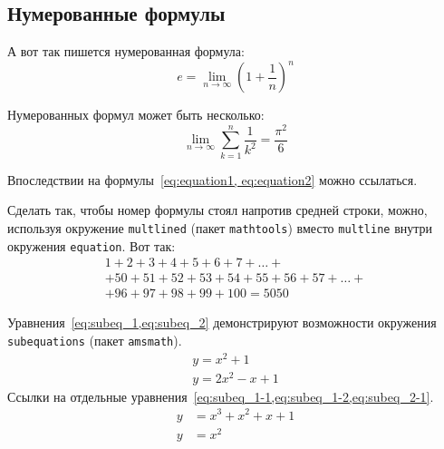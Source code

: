 \subsection{Нумерованные формулы}\label{subsec:ch1/sec3/sub3}

А вот так пишется нумерованная формула:
\begin{equation}
    \label{eq:equation1}
    e = \lim_{n \to \infty} \left( 1+\frac{1}{n} \right) ^n
\end{equation}

Нумерованных формул может быть несколько:
\begin{equation}
    \label{eq:equation2}
    \lim_{n \to \infty} \sum_{k=1}^n \frac{1}{k^2} = \frac{\pi^2}{6}
\end{equation}

Впоследствии на формулы~\cref{eq:equation1, eq:equation2} можно ссылаться.

Сделать так, чтобы номер формулы стоял напротив средней строки, можно,
используя окружение \verb|multlined| (пакет \verb|mathtools|) вместо
\verb|multline| внутри окружения \verb|equation|. Вот так:
\begin{equation} %
    \label{eq:equation3}
    \begin{multlined}
        1+ 2+3+4+5+6+7+\dots + \\
        + 50+51+52+53+54+55+56+57 + \dots + \\
        + 96+97+98+99+100=5050
    \end{multlined}
\end{equation}

Уравнения~\cref{eq:subeq_1,eq:subeq_2} демонстрируют возможности
окружения \verb|subequations| (пакет \verb|amsmath|).
\begin{subequations}
    \label{eq:subeq_1}
    \begin{gather}
        y = x^2 + 1 \label{eq:subeq_1-1} \\
        y = 2 x^2 - x + 1 \label{eq:subeq_1-2}
    \end{gather}
\end{subequations}
Ссылки на отдельные уравнения~\cref{eq:subeq_1-1,eq:subeq_1-2,eq:subeq_2-1}.
\begin{subequations}
    \label{eq:subeq_2}
    \begin{align}
        y & = x^3 + x^2 + x + 1 \label{eq:subeq_2-1} \\
        y & = x^2
    \end{align}
\end{subequations}

